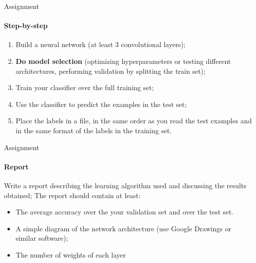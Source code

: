 \documentclass[10pt]{beamer}
\begin{document}
\begin{frame}{Assignment}
\framesubtitle{Step-by-step}


\begin{enumerate}
		\item Build a neural network (at least 3 convolutional layers);
\item {\bf Do model selection} (optimizing hyperparameters
		or testing different architectures, performing validation by splitting the train set);
\item Train your classifier over the full training set;
\item Use the classifier to predict the examples in the test set;
\item Place the labels in a file, in the same order as you read the test
      examples and in the same format of the labels in the training set.
\end{enumerate}

\end{frame}

\begin{frame}{Assignment}
\framesubtitle{Report}

 Write a report describing the learning algorithm used and discussing the
results obtained; The report should contain at least:
    \begin{itemize}
    \item The average accuracy over the your validation set and over the test set.
    \item A simple diagram of the network architecture (use Google Drawings or similar software);
	\item The number of weights of each layer
    \end{itemize}

\end{frame}
\end{document}

